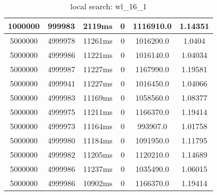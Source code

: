 \documentclass[./main.tex]{subfiles}
\begin{document}
\begin{table}
\begin{tabular}{ c | c | c | c | c | c }
        \rowcolor{lightgray} 1000000 & 999983 & 2119ms & 0 & 1116910.0 & 1.14351 \\
        \hline
        5000000 & 4999978 & 11261ms & 0 & 1016200.0 & 1.0404 \\
        5000000 & 4999986 & 11221ms & 0 & 1016140.0 & 1.04034 \\
        5000000 & 4999987 & 11227ms & 0 & 1167990.0 & 1.19581 \\
        5000000 & 4999941 & 11227ms & 0 & 1016450.0 & 1.04066 \\
        \rowcolor{lightgray} 5000000 & 4999983 & 11169ms & 0 & 1058560.0 & 1.08377 \\
        5000000 & 4999975 & 11211ms & 0 & 1166370.0 & 1.19414 \\
        5000000 & 4999973 & 11164ms & 0 & 993907.0 & 1.01758 \\
        5000000 & 4999980 & 11184ms & 0 & 1091950.0 & 1.11795 \\
        5000000 & 4999982 & 11205ms & 0 & 1120210.0 & 1.14689 \\
        5000000 & 4999986 & 11237ms & 0 & 1035490.0 & 1.06015 \\
        5000000 & 4999986 & 10902ms & 0 & 1166370.0 & 1.19414 \\
    \end{tabular}
    \caption{local search: wl\_16\_1}
\end{table}
\end{document}
